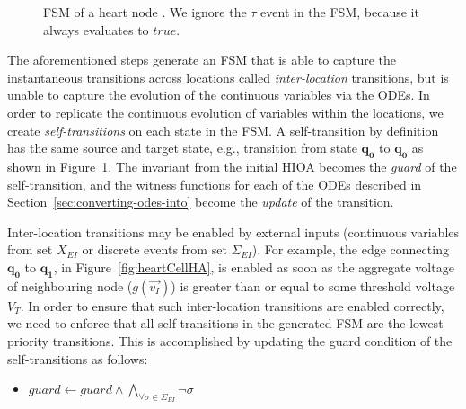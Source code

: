 
\begin{figure}
	\centering 
	\caption{\acf{FSM} of a heart node \label{fig:heartCellFSM}. We ignore
		the $\tau$ event in the \ac{FSM}, because it always evaluates to
		$true$.}
\end{figure}

The aforementioned steps generate an \ac{FSM} that is able to capture
the instantaneous transitions across locations called
\textit{inter-location} transitions, but is unable to capture the
evolution of the continuous variables via the \acp{ODE}. In order to
replicate the continuous evolution of variables within the locations, we
create \textit{self-transitions} on each state in the \ac{FSM}. A
self-transition by definition has the same source and target state,
e.g., transition from state $\mathbf{q_{0}}$ to $\mathbf{q_{0}}$ as shown in
Figure~\ref{fig:heartCellFSM}. The invariant from the initial
\ac{HIOA} becomes the \emph{guard} of the self-transition, and the witness
functions for each of the \acp{ODE} described in
Section~\ref{sec:converting-odes-into} become the \emph{update} of the
transition.

Inter-location transitions may be enabled by external inputs (continuous 
variables from set $X_{EI}$ or discrete events from set $\Sigma_{EI}$). For 
example, the edge connecting $\mathbf{q_{0}}$ to $\mathbf{q_{1}}$, in 
Figure~\ref{fig:heartCellHA},
is enabled as soon as the aggregate voltage of neighbouring node
($g(\vec{v_{I}})$) is greater than or equal to some threshold voltage
$V_{T}$. In order to ensure that such inter-location transitions are
enabled correctly, we need to enforce that all self-transitions in the
generated \ac{FSM} are the lowest priority transitions. This is
accomplished by updating the guard condition of the self-transitions as
follows:
\begin{itemize}
\item
  $guard \leftarrow guard \wedge \bigwedge_{\forall \sigma \in
    \Sigma_{EI}} \neg \sigma$
\end{itemize}

